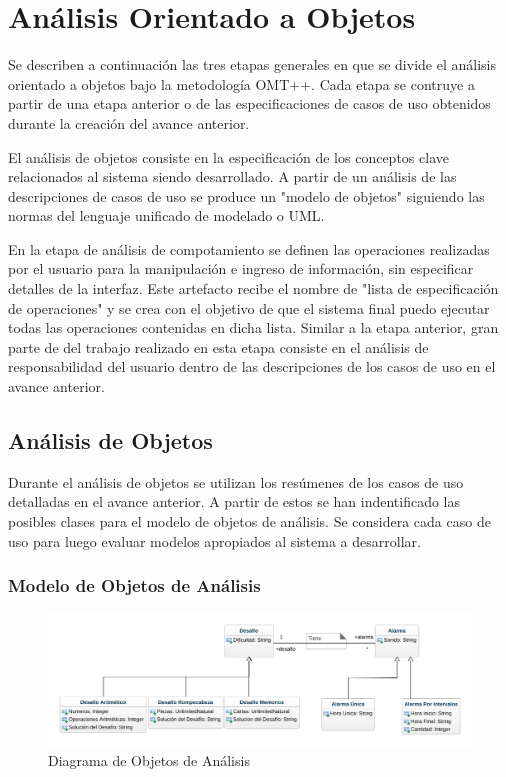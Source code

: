 \section{Análisis Orientado a Objetos}
Se describen a continuación las tres etapas generales en que se divide el análisis orientado a objetos bajo la metodología OMT++. Cada etapa se contruye a partir de una etapa anterior o de las especificaciones de casos de uso obtenidos durante la creación del avance anterior.

El análisis de objetos consiste en la especificación de los conceptos clave relacionados al sistema siendo desarrollado. A partir de un análisis de las descripciones de casos de uso se produce un "modelo de objetos" siguiendo las normas del lenguaje unificado de modelado o UML.

En la etapa de análisis de compotamiento se definen las operaciones realizadas por el usuario para la manipulación e ingreso de información, sin especificar detalles de la interfaz. Este artefacto recibe el nombre de "lista de especificación de operaciones" y se crea con el objetivo de que el sistema final puedo ejecutar todas las operaciones contenidas en dicha lista. Similar a la etapa anterior, gran parte de del trabajo realizado en esta etapa consiste en el análisis de responsabilidad del usuario dentro de las descripciones de los casos de uso en el avance anterior.

\subsection{Análisis de Objetos}
Durante el análisis de objetos se utilizan los resúmenes de los casos de uso detalladas en el avance anterior. A partir de estos se han indentificado las posibles clases para el modelo de objetos de análisis. Se considera cada caso de uso para luego evaluar modelos apropiados al sistema a desarrollar.

\subsubsection{Modelo de Objetos de Análisis}
\begin{figure}[H]
	\centering
	\includegraphics[page=1,width=\textwidth]{./img/uml.png}
	\caption{Diagrama de Objetos de Análisis}
        \vspace{10pt}
	\label{fig:Diagrama de Objetos de Análisis}
\end{figure}

